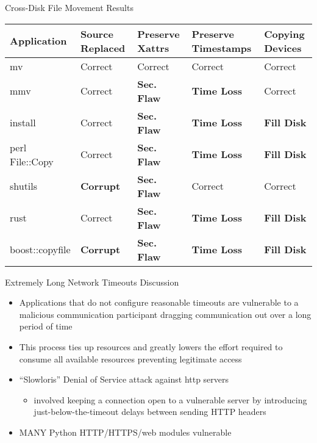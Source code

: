 \documentclass[pdf]{beamer}
\begin{document}
\begin{frame}{Cross-Disk File Movement Results}
  \tiny{}
    \begin{tabular}{l p{1cm} p{1cm} p{1.2cm} p{1cm}}
        Application     & Source Replaced & Preserve Xattrs & Preserve Timestamps & Copying Devices\\
\hline
        mv              & Correct             & Correct         & Correct             & Correct\\
        mmv             & Correct             & {\bf Sec. Flaw} & {\bf Time
Loss} & Correct\\
        install         & Correct             & {\bf Sec. Flaw} & {\bf Time
Loss} & {\bf Fill Disk} \\
        perl File::Copy & Correct             & {\bf Sec. Flaw} & {\bf Time
Loss} & {\bf Fill Disk} \\
        shutils         & {\bf Corrupt}	& {\bf Sec. Flaw} 	& Correct             & Correct\\
        rust            & Correct             & {\bf Sec. Flaw} & {\bf Time
Loss} & {\bf Fill Disk} \\
        boost::copyfile & {\bf Corrupt}	      & {\bf Sec. Flaw} & {\bf Time
Loss} & {\bf Fill Disk} \\
    \end{tabular}
\end{frame}


\begin{frame}{Extremely Long Network Timeouts Discussion}
  \begin{itemize}
  \item{Applications that do not configure reasonable timeouts are vulnerable
      to a malicious communication participant dragging communication out over a
      long period of time}
  \item{This process ties up resources and greatly lowers the effort required to
      consume all available resources preventing legitimate access}
  \item{``Slowloris'' Denial of Service attack against http servers}
    \begin{itemize}
    \item{involved keeping a connection open to a vulnerable server by
        introducing just-below-the-timeout delays between sending HTTP headers}
        \end{itemize}
  \item{MANY Python HTTP/HTTPS/web modules vulnerable}
  \end{itemize}
\end{frame}
\end{document}
